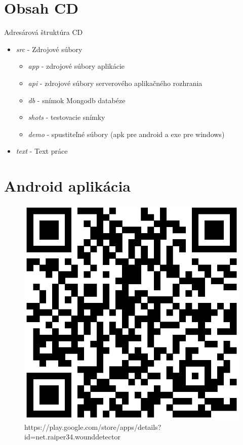 \chapter{Obsah CD}
\label{pr:cd}
Adresárová štruktúra CD
\begin{itemize}
\item \textit{src} - Zdrojové súbory
    \begin{itemize}
    \item \textit{app} - zdrojové súbory aplikácie
    \item \textit{api} - zdrojové súbory serverového aplikačného rozhrania
    \item \textit{db} - snímok Mongodb databéze
    \item \textit{shots} - testovacie snímky
    \item \textit{demo} - spustiteľné súbory (apk pre android a exe pre windows)
    \end{itemize}
\item \textit{text} - Text práce
\end{itemize}

\chapter{Android aplikácia}
\label{pr:qr}
\begin{figure}[h]
      \centering
      \includegraphics[scale=0.6]{fig/qr-play-google-com.eps}
      \caption{https://play.google.com/store/apps/details?id=net.raiper34.wounddetector}
      \label{fig:qr}
\end{figure}
